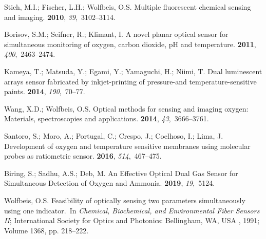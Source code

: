 \documentclass[sensors,article,accept,moreauthors,pdftex,10pt,a4paper]{Definitions/mdpi}
\theoremstyle{definition}
\begin{document}
\begin{thebibliography}{999}
\providecommand{\natexlab}[1]{#1}

Stich, M.I.; Fischer, L.H.; Wolfbeis, O.S.
\newblock Multiple fluorescent chemical sensing and imaging.
 {\bf 2010}, {\em 39},~3102--3114.

Borisov, S.M.; Seifner, R.; Klimant, I.
\newblock A novel planar optical sensor for simultaneous monitoring of oxygen,
  carbon dioxide, pH and temperature.
 {\bf 2011}, {\em
  400},~2463--2474.

Kameya, T.; Matsuda, Y.; Egami, Y.; Yamaguchi, H.; Niimi, T.
\newblock Dual luminescent arrays sensor fabricated by inkjet-printing of
  pressure-and temperature-sensitive paints.
 {\bf 2014}, {\em
  190},~70--77.

Wang, X.D.; Wolfbeis, O.S.
\newblock Optical methods for sensing and imaging oxygen: Materials,
  spectroscopies and applications.
 {\bf 2014}, {\em 43},~3666--3761.

Santoro, S.; Moro, A.; Portugal, C.; Crespo, J.; Coelhoso, I.; Lima, J.
\newblock Development of oxygen and temperature sensitive membranes using
  molecular probes as ratiometric sensor.
 {\bf 2016}, {\em 514},~467--475.

Biring, S.; Sadhu, A.S.; Deb, M.
\newblock An Effective Optical Dual Gas Sensor for Simultaneous Detection of
  Oxygen and Ammonia.
 {\bf 2019}, {\em 19},~5124.

Wolfbeis, O.S.
\newblock Feasibility of optically sensing two parameters simultaneously using
  one indicator.~\newblock  In \emph{Chemical, Biochemical, and Environmental Fiber Sensors II}; International Society for Optics and Photonics: Bellingham, WA, USA %
, 1991; Volume 1368, pp. 218--222.


\end{thebibliography}
\end{document}
